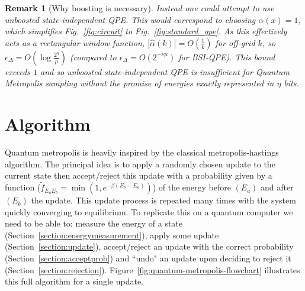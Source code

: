 \documentclass[aps,floatfix,10pt,amssymb,amsfont,amsmath,superscriptaddress,float,nofootinbib,longbibliography,nobalancelastpage,twocolumn]{revtex4-2}
\newtheorem{remark}{Remark}
\begin{document}
\begin{remark}[Why boosting is necessary]
Instead one could attempt to use unboosted state-independent QPE. This would correspond to choosing $\alpha(x)=1$, which simplifies Fig.~\ref{fig:circuit} to Fig.~\ref{fig:standard_qpe}. As this effectively acts as a rectangular window function, $|\hat\alpha(k)| = O(\frac{1}{k})$ for off-grid $k$, so $\epsilon_{\Delta} = O(\log \frac{2^{\eta}}{\mu})$ (compared to $\epsilon_{\Delta} = O(2^{-\nu \mu})$ for BSI-QPE). This bound exceeds $1$ and so unboosted state-independent QPE is insufficient for Quantum Metropolis sampling without the promise of energies exactly represented in $\eta$ bits.
\end{remark}
\medskip
\noindent{}
\medskip


\section{Algorithm}
\label{section:algorithm}
Quantum metropolis is heavily inspired by the classical metropolis-hastings algorithm. The principal idea is to apply a randomly chosen update to the current state then accept/reject this update with a probability given by a function ($\tilde{f}_{E_aE_b}=\min(1, e^{-\beta(E_b-E_a)})$) of the energy before $(E_a)$ and after $(E_b)$ the update. This update process is repeated many times with the system quickly converging to equilibrium. To replicate this on a quantum computer we need to be able to: measure the energy of a state (Section~\ref{section:energymeasurement}), apply some update (Section~\ref{section:update}), accept/reject an update with the correct probability (Section~\ref{section:acceptprob}) and ``undo" an update upon deciding to reject it (Section~\ref{section:rejection}). Figure~\ref{fig:quantum-metropolis-flowchart} illustrates this full algorithm for a single update.
\end{document}
